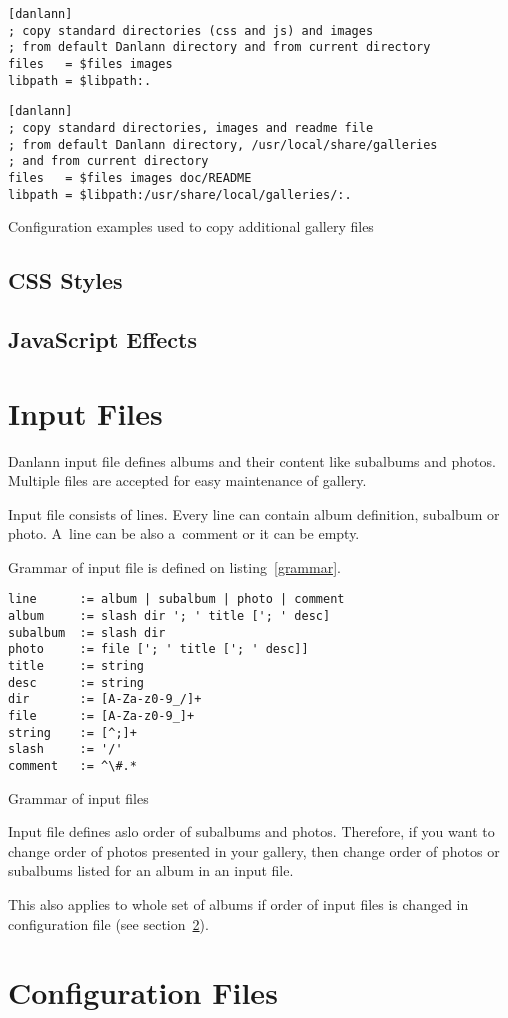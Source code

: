 \documentclass{article}
\begin{document}
\begin{listing}
\begin{lstlisting}
[danlann]
; copy standard directories (css and js) and images
; from default Danlann directory and from current directory
files   = $files images
libpath = $libpath:.
\end{lstlisting}

\begin{lstlisting}
[danlann]
; copy standard directories, images and readme file
; from default Danlann directory, /usr/local/share/galleries
; and from current directory
files   = $files images doc/README
libpath = $libpath:/usr/share/local/galleries/:.
\end{lstlisting}
\caption{Configuration examples used to copy additional gallery files}\label{conf:copy}
\end{listing}

\subsection{CSS Styles}

\subsection{JavaScript Effects}

\section{Input Files}\label{albums}
Danlann input file defines albums and their content like subalbums and
photos. Multiple files are accepted for easy maintenance of gallery.

Input file consists of lines. Every line can contain album definition,
subalbum or photo. A~line can be also a~comment or it can be empty.

Grammar of input file is defined on listing~\ref{grammar}.

\begin{listing}
\begin{lstlisting}
line      := album | subalbum | photo | comment
album     := slash dir '; ' title ['; ' desc]
subalbum  := slash dir
photo     := file ['; ' title ['; ' desc]]
title     := string
desc      := string
dir       := [A-Za-z0-9_/]+
file      := [A-Za-z0-9_]+
string    := [^;]+
slash     := '/'
comment   := ^\#.*
\end{lstlisting}
\caption{Grammar of input files}\label{grammar}
\end{listing}

Input file defines aslo order of subalbums and photos. 
Therefore, if you want to change order of photos presented in your gallery, then
change order of photos or subalbums listed for an album in an input file.

This also applies to whole set of albums if order of input files is changed
in configuration file (see section~\ref{conf:all}).


\section{Configuration Files}\label{conf:all}
\end{document}
